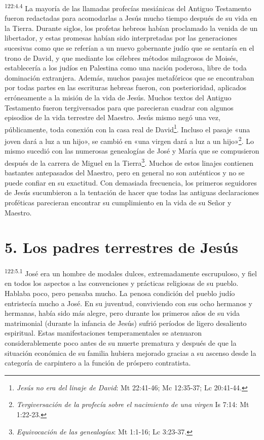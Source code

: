 \par 
\textsuperscript{122:4.4} La mayoría de las llamadas profecías mesiánicas del Antiguo Testamento fueron redactadas para acomodarlas a Jesús mucho tiempo después de su vida en la Tierra. Durante siglos, los profetas hebreos habían proclamado la venida de un libertador, y estas promesas habían sido interpretadas por las generaciones sucesivas como que se referían a un nuevo gobernante judío que se sentaría en el trono de David, y que mediante los célebres métodos milagrosos de Moisés, establecería a los judíos en Palestina como una nación poderosa, libre de toda dominación extranjera. Además, muchos pasajes metafóricos que se encontraban por todas partes en las escrituras hebreas fueron, con posterioridad, aplicados erróneamente a la misión de la vida de Jesús. Muchos textos del Antiguo Testamento fueron tergiversados para que parecieran cuadrar con algunos episodios de la vida terrestre del Maestro. Jesús mismo negó una vez, públicamente, toda conexión con la casa real de David\footnote{\textit{Jesús no era del linaje de David}: Mt 22:41-46; Mc 12:35-37; Lc 20:41-44.}. Incluso el pasaje «una joven dará a luz a un hijo», se cambió en «una virgen dará a luz a un hijo»\footnote{\textit{Tergiversación de la profecía sobre el nacimiento de una virgen} Is 7:14: Mt 1:22-23.}. Lo mismo sucedió con las numerosas genealogías de José y María que se compusieron después de la carrera de Miguel en la Tierra\footnote{\textit{Equivocación de las genealogías}: Mt 1:1-16; Lc 3:23-37.}. Muchos de estos linajes contienen bastantes antepasados del Maestro, pero en general no son auténticos y no se puede confiar en su exactitud. Con demasiada frecuencia, los primeros seguidores de Jesús sucumbieron a la tentación de hacer que todas las antiguas declaraciones proféticas parecieran encontrar su cumplimiento en la vida de su Señor y Maestro.

\section*{5. Los padres terrestres de Jesús}
\par 
\textsuperscript{122:5.1} José era un hombre de modales dulces, extremadamente escrupuloso, y fiel en todos los aspectos a las convenciones y prácticas religiosas de su pueblo. Hablaba poco, pero pensaba mucho. La penosa condición del pueblo judío entristecía mucho a José. En su juventud, conviviendo con sus ocho hermanos y hermanas, había sido más alegre, pero durante los primeros años de su vida matrimonial
(durante la infancia de Jesús) sufrió períodos de ligero desaliento espiritual. Estas manifestaciones temperamentales se atenuaron considerablemente poco antes de su muerte prematura y después de que la situación económica de su familia hubiera mejorado gracias a su ascenso desde la categoría de carpintero a la función de próspero contratista.

